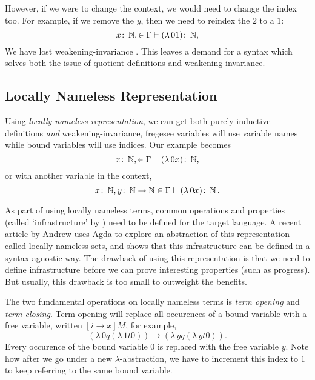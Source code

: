 However, if we were to change the context, we would need to change the index too. For example, if we
remove the $y$, then we need to reindex the $2$ to a $1$:
\begin{equation*}
  x \colon \operatorname{\mathbb{N}}, \in \Gamma \vdash (\lambda \, 0 1) \colon \operatorname{\mathbb{N}},
\end{equation*}
We have lost weakening-invariance \citep{aydemir_engineering_2008}. This leaves a demand for a
syntax which solves both the issue of quotient definitions and weakening-invariance.

\subsection{Locally Nameless Representation}
Using \textit{locally nameless representation}, we can get both purely inductive definitions
\textit{and} weakening-invariance, fregesee variables will use variable names while bound variables will
use indices. Our example becomes
\begin{equation*}
  x \colon \operatorname{\mathbb{N}}, \in \Gamma \vdash (\lambda \, 0 x) \colon \operatorname{\mathbb{N}},
\end{equation*}
or with another variable in the context,
\begin{equation*}
  x \colon \operatorname{\mathbb{N}}, y \colon \operatorname{\mathbb{N}} \to \operatorname{\mathbb{N}} \in \Gamma \vdash (\lambda \, 0 x) \colon \operatorname{\mathbb{N}}.
\end{equation*}

As part of using locally nameless terms, common operations and properties (called `infrastructure'
by \citet{aydemir_engineering_2008}) need to be defined for the target language. A recent article by
Andrew \citet{pitts_locally_2023} uses Agda to explore an abstraction of this representation called
locally nameless sets, and shows that this infrastructure can be defined in a syntax-agnostic way.
The drawback of using this representation is that we need to define infrastructure before we can
prove interesting properties (such as progress). But usually, this drawback is too small to
outweight the benefits.

The two fundamental operations on locally nameless terms is \textit{term opening} and \textit{term
closing}. Term opening will replace all occurences of a bound variable with a free variable, written
$[i \to x] M$, for example,
\begin{equation*}
  [0 \to y] (\lambda \, 0 q (\lambda \, 1 t 0)) \mapsto (\lambda \, y q (\lambda \, y t 0)).
\end{equation*}
Every occurence of the bound variable $0$ is replaced with the free variable $y$. Note how after we
go under a new $\lambda$-abstraction, we have to increment this index to $1$ to keep referring to
the same bound variable.

